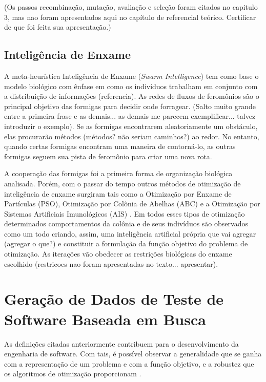 (Os passos recombinação, mutação, avaliação e seleção foram citados no
capitulo 3, mas nao foram apresentados aqui no capítulo de referencial teórico.
Certificar de que foi feita sua apresentação.)


\subsection{Inteligência de Enxame}

A meta-heurística Inteligência de Enxame (\textit{Swarm Intelligence}) tem como base o modelo biológico com ênfase em como os indivíduos trabalham em conjunto com a distribuição de informações (referencia). As redes de fluxos de feromônios são o principal objetivo das formigas para decidir onde forragear. (Salto muito grande entre a primeira frase e as demais... as demais me parecem exemplificar...  talvez introduzir o exemplo). Se as formigas encontrarem aleatoriamente um obstáculo, elas procurarão métodos (métodos? não seriam caminhos?) ao redor. No entanto, quando certas formigas encontram uma maneira de contorná-lo, as outras formigas seguem sua pista de feromônio para criar uma nova rota.

A cooperação das formigas foi a primeira forma de organização biológica analisada. Porém, com o passar do tempo  outros métodos de otimização de inteligência de enxame surgiram tais como a Otimização por Enxame de Partículas (PSO), Otimização por Colônia de Abelhas (ABC) e a Otimização por Sistemas Artificiais Imunológicos (AIS) \cite{blum2008swarm}. Em todos esses tipos de otimização determinados comportamentos da colônia e de seus indivíduos são observados como um todo criando, assim, uma inteligência artificial própria que vai agregar (agregar o que?) e constituir a formulação da função objetivo do problema de otimização. As iterações vão obedecer as restrições biológicas do enxame escolhido (restricoes nao foram apresentadas no texto... apresentar).

\section{Geração de Dados de Teste de Software Baseada em Busca \label{sec:trabsSBST}}

As definições citadas anteriormente contribuem para o desenvolvimento da engenharia de software. Com tais, é possível observar a generalidade que se ganha com a representação de um problema e com a função objetivo, e a robustez que os algoritmos de otimização proporcionam \cite{harman2012search}. 

